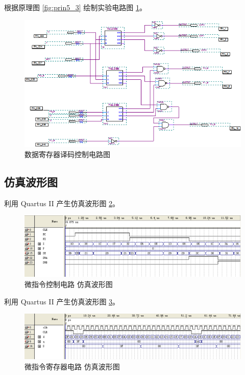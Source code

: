 根据原理图 \ref{fig:prin5_3} 绘制实验电路图 \ref{fig:bdf5_3}。

\begin{figure}[H]
\centering
\includegraphics[width=\textwidth]{images/bdf5_3.png}
\caption{数据寄存器译码控制电路图}
\label{fig:bdf5_3}
\end{figure}

\subsection{仿真波形图}

利用 Quartus II 产生仿真波形图 \ref{fig:wave5_1}。

\begin{figure}[H]
\centering
\includegraphics[width=\textwidth]{images/wave5_1.png}
\caption{微指令控制电路 仿真波形图}
\label{fig:wave5_1}
\end{figure}

利用 Quartus II 产生仿真波形图 \ref{fig:wave5_2}。

\begin{figure}[H]
\centering
\includegraphics[width=\textwidth]{images/wave5_2.png}
\caption{微指令寄存器电路 仿真波形图}
\label{fig:wave5_2}
\end{figure}

